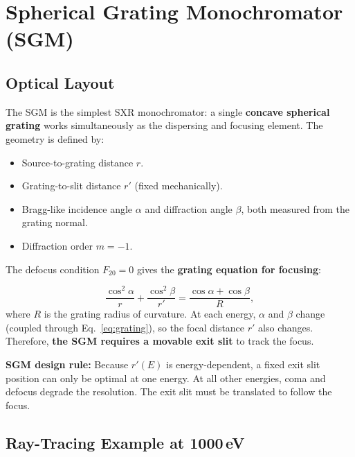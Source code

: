 \documentclass[12pt,a4paper]{article}
\newcommand{\al}{\alpha}
\newcommand{\be}{\beta}
\begin{document}
\section{Spherical Grating Monochromator (SGM)}

\subsection{Optical Layout}

The SGM is the simplest SXR monochromator: a single \textbf{concave spherical grating}
works simultaneously as the dispersing and focusing element.  The geometry is defined by:

\begin{itemize}
  \item Source-to-grating distance $r$.
  \item Grating-to-slit distance $r'$ (fixed mechanically).
  \item Bragg-like incidence angle $\al$ and diffraction angle $\be$, both measured from
        the grating normal.
  \item Diffraction order $m = -1$.
\end{itemize}

The defocus condition $F_{20} = 0$ gives the \textbf{grating equation for focusing}:

\begin{equation}
  \frac{\cos^2\al}{r} + \frac{\cos^2\be}{r'} = \frac{\cos\al + \cos\be}{R},
  \label{eq:SGM_focus}
\end{equation}
where $R$ is the grating radius of curvature.  At each energy, $\al$ and $\be$ change
(coupled through Eq.~\eqref{eq:grating}), so the focal distance $r'$ also changes.
Therefore, \textbf{the SGM requires a movable exit slit} to track the focus.

\begin{notebox}
\textbf{SGM design rule:} Because $r'(E)$ is energy-dependent, a fixed exit slit position
can only be optimal at one energy.  At all other energies, coma and defocus degrade the
resolution.  The exit slit must be translated to follow the focus.
\end{notebox}

\subsection{Ray-Tracing Example at 1000\,eV}
\end{document}
